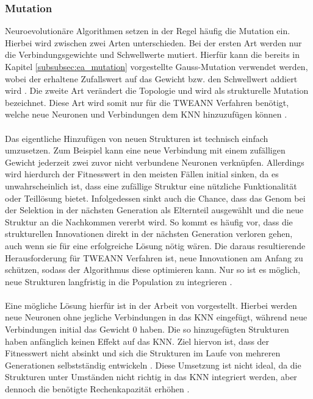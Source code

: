 \subsubsection{Mutation}
\label{subsubsec:mutation}
Neuroevolutionäre Algorithmen setzen in der Regel häufig die Mutation ein. Hierbei wird zwischen zwei Arten unterschieden. Bei der ersten Art werden nur die Verbindungsgewichte und Schwellwerte mutiert. Hierfür kann die bereits in Kapitel \ref{subsubsec:ea_mutation} vorgestellte Gauss-Mutation verwendet werden, wobei der erhaltene Zufallswert auf das Gewicht bzw. den Schwellwert addiert wird \cite{mcintyre_neatpython}. Die zweite Art verändert die Topologie und wird als strukturelle Mutation bezeichnet. Diese Art wird somit nur für die \ac{TWEANN} Verfahren benötigt, welche neue Neuronen und Verbindungen dem \ac{KNN} hinzuzufügen können \cite{stanley2002evolving}.
\\\\
Das eigentliche Hinzufügen von neuen Strukturen ist technisch einfach umzusetzen. Zum Beispiel kann eine neue Verbindung mit einem zufälligen Gewicht jederzeit zwei zuvor nicht verbundene Neuronen verknüpfen. Allerdings wird hierdurch der Fitnesswert in den meisten Fällen initial sinken, da es unwahrscheinlich ist, dass eine zufällige Struktur eine nützliche Funktionalität oder Teillösung bietet. Infolgedessen sinkt auch die Chance, dass das Genom bei der Selektion in der nächsten Generation als Elternteil ausgewählt und die neue Struktur an die Nachkommen vererbt wird. So kommt es häufig vor, dass die strukturellen Innovationen direkt in der nächsten Generation verloren gehen, auch wenn sie für eine erfolgreiche Lösung nötig wären. Die daraus resultierende Herausforderung für \ac{TWEANN} Verfahren ist, neue Innovationen am Anfang zu schützen, sodass der Algorithmus diese optimieren kann. Nur so ist es möglich, neue Strukturen langfristig in die Population zu integrieren \cite{stanley2002evolving}.
\\\\
Eine mögliche Lösung hierfür ist in der Arbeit von \citeauthor{angeline1994gnarl} vorgestellt. Hierbei werden neue Neuronen ohne jegliche Verbindungen in das \ac{KNN} eingefügt, während neue Verbindungen initial das Gewicht $0$ haben. Die so hinzugefügten Strukturen haben anfänglich keinen Effekt auf das \ac{KNN}. Ziel hiervon ist, dass der Fitnesswert nicht absinkt und sich die Strukturen im Laufe von mehreren Generationen selbstständig entwickeln \cite{angeline1994gnarl}. Diese Umsetzung ist nicht ideal, da die Strukturen unter Umständen nicht richtig in das \ac{KNN} integriert werden, aber dennoch die benötigte Rechenkapazität erhöhen \cite{stanley2002evolving}.

